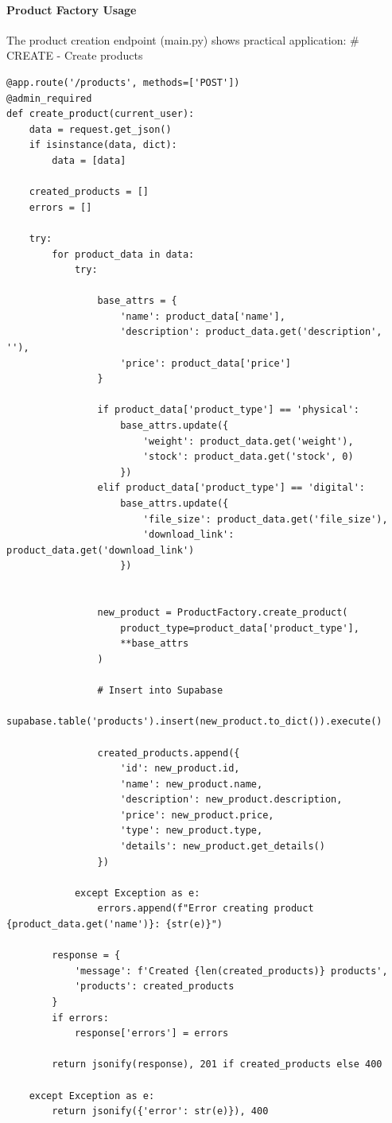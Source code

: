 \documentclass[12pt,a4paper]{article}
\begin{document}
\paragraph{Product Factory Usage}
The product creation endpoint (main.py) shows practical application:
# CREATE - Create products
\begin{verbatim}
@app.route('/products', methods=['POST'])
@admin_required
def create_product(current_user):
    data = request.get_json()
    if isinstance(data, dict):
        data = [data]
    
    created_products = []
    errors = []

    try:
        for product_data in data:
            try:
          
                base_attrs = {
                    'name': product_data['name'],
                    'description': product_data.get('description', ''),
                    'price': product_data['price']
                }

                if product_data['product_type'] == 'physical':
                    base_attrs.update({
                        'weight': product_data.get('weight'),
                        'stock': product_data.get('stock', 0)
                    })
                elif product_data['product_type'] == 'digital':
                    base_attrs.update({
                        'file_size': product_data.get('file_size'),
                        'download_link': product_data.get('download_link')
                    })

               
                new_product = ProductFactory.create_product(
                    product_type=product_data['product_type'],
                    **base_attrs
                )
                
                # Insert into Supabase
                supabase.table('products').insert(new_product.to_dict()).execute()
                
                created_products.append({
                    'id': new_product.id,
                    'name': new_product.name,
                    'description': new_product.description,
                    'price': new_product.price,
                    'type': new_product.type,
                    'details': new_product.get_details()
                })
                
            except Exception as e:
                errors.append(f"Error creating product {product_data.get('name')}: {str(e)}")
        
        response = {
            'message': f'Created {len(created_products)} products',
            'products': created_products
        }
        if errors:
            response['errors'] = errors
            
        return jsonify(response), 201 if created_products else 400
    
    except Exception as e:
        return jsonify({'error': str(e)}), 400

\end{verbatim}
\end{document}
